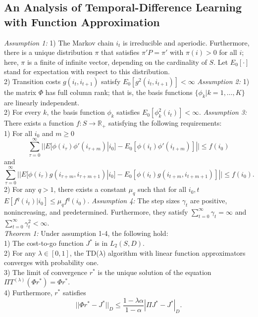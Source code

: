 \documentclass[a4paper, fontsize=8pt, landscape, DIV=1]{scrartcl}
\begin{document}
\begin{multicols*}{3}
\subsection{An Analysis of Temporal-Difference Learning with Function Approximation}
\textit{Assumption 1:} 1) The Markov chain $i_t$ is irreducible and aperiodic. Furthermore, there is a unique distribution $\pi$ that satisfies $\pi'P=\pi'$ with $\pi(i)>0$ for all $i$; here, $\pi$ is a finite of infinite vector, depending on the cardinality of $S$. Let $E_0[\cdot]$ stand for expectation with respect to this distribution.\\
2) Transition costs $g(i_t,i_{t+1})$ satisfy $E_0[g^2(i_t,i_{t+1})]<\infty$
\textit{Assumption 2:} 1) the matrix $\Phi$ has full column rank; that is, the basis functions $\{\phi_k|k=1,\ldots,K\}$ are linearly independent.\\
2) For every $k$, the basis function $\phi_k$ satisfies $E_0[\phi_k^2(i_t)]<\infty$.
\textit{Assumption 3:} There exists a function $f:S\rightarrow\mathbb{R}_+$ satisfying the following requirements:\\
1) For all $i_0$ and $m\ge0$
\begin{equation*}
\sum\limits_{\tau=0}^{\infty}||E[\phi(i_{\tau})\phi'(i_{\tau+m})|i_0]-E_0[\phi(i_t)\phi'(i_{t+m})]||\le f(i_0)
\end{equation*}
and
\begin{equation*}
\sum\limits_{\tau=0}^{\infty}||E[\phi(i_{\tau})g(i_{\tau+m},i_{\tau+m+1})|i_0]-E_0[\phi(i_t)g(i_{t+m},i_{t+m+1})]||\le f(i_0).
\end{equation*}
2) For any $q>1$, there exists a constant $\mu_q$ such that for all $i_0,t$ $E[f^q(i_t)|i_0]\le\mu_q f^q(i_0)$.
\textit{Assumption 4:}
The step sizes $\gamma_t$ are positive, nonincreasing, and predetermined. Furthermore, they satisfy $\sum\limits_{t=0}^{\infty}\gamma_t=\infty$ and $\sum\limits_{t=0}^{\infty}\gamma_t^2<\infty$.\\[5pt]
\textit{Theorem 1:} Under assumption 1-4, the following hold:\\
1) The cost-to-go function $J^*$ is in $L_2(S,D)$.\\
2) For any $\lambda\in[0,1]$, the TD($\lambda$) algorithm with linear function approximators converges with probability one.\\
3) The limit of convergence $r^*$ is the unique solution of the equation $\Pi T^{(\lambda)}(\Phi r^*)=\Phi r^*$.\\
4) Furthermore, $r^*$ satisfies
\begin{equation*}
||\Phi r^*-J^*||_D\le\frac{1-\lambda\alpha}{1-\alpha}|\Pi J^*-J^*|_D.
\end{equation*}


\end{multicols*}
\end{document}
